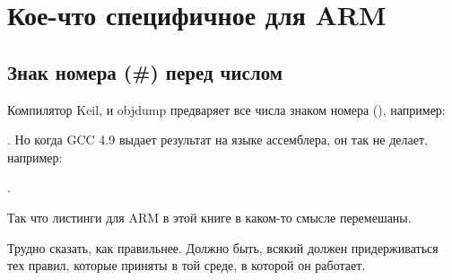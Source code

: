 ﻿\section{Кое-что специфичное для ARM}

\subsection{Знак номера (\#) перед числом}

Компилятор Keil, \IDA и objdump предваряет все числа знаком номера (\q{\#}), например:

.
Но когда GCC 4.9 выдает результат на языке ассемблера, он так не делает, например:

.

Так что листинги для ARM в этой книге в каком-то смысле перемешаны.

Трудно сказать, как правильнее.
Должно быть, всякий должен придерживаться тех правил, которые приняты в той среде, в которой он работает.




